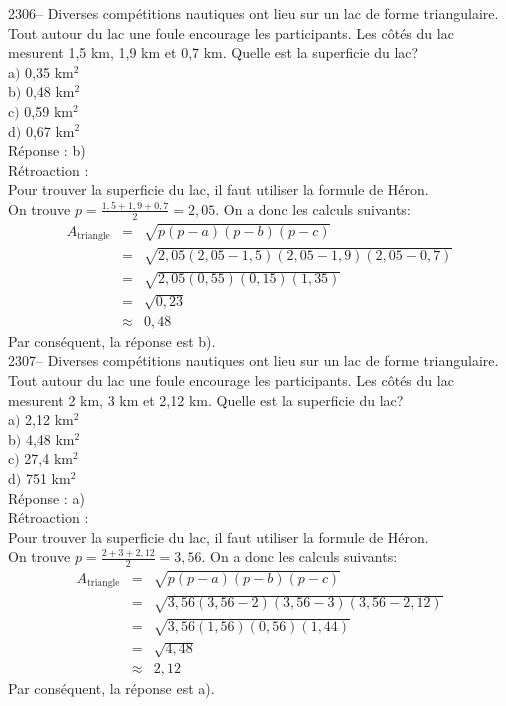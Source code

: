 \documentclass[letterpaper, 12pt]{article}
\begin{document}
2306-- Diverses comp\'etitions nautiques ont lieu sur un lac de forme triangulaire. Tout autour du lac une foule encourage les participants. Les c\^ot\'es du lac mesurent 1,5 km, 1,9 km et 0,7 km.  Quelle est la superficie du lac? \\

a$)$ 0,35 km$^{2}$\\
b$)$ 0,48 km$^{2}$\\
c$)$ 0,59 km$^{2}$\\
d$)$ 0,67 km$^{2}$\\

R\'eponse : b)\\

R\'etroaction :\\
Pour trouver la superficie du lac, il faut utiliser la formule de H\'eron.\\
On trouve \mbox{$p=\frac{1,5+1,9+0,7}{2}=2,05$}. On a donc les calculs suivants:
 \begin{eqnarray*}
A_{\textrm{triangle}}&=&\sqrt{p(p-a)(p-b)(p-c)}\\
&=&\sqrt{2,05(2,05-1,5)(2,05-1,9)(2,05-0,7)}\\
&=&\sqrt{2,05(0,55)(0,15)(1,35)}\\
&=&\sqrt{0,23}\\
&\approx&0,48
\end{eqnarray*}
Par cons\'equent, la r\'eponse est b).\\

2307-- Diverses comp\'etitions nautiques ont lieu sur un lac de forme triangulaire. Tout autour du lac une foule encourage les participants. Les c\^ot\'es du lac mesurent 2 km, 3 km et 2,12 km.  Quelle est la superficie du lac? \\

a$)$ 2,12 km$^{2}$\\
b$)$ 4,48 km$^{2}$\\
c$)$ 27,4 km$^{2}$\\
d$)$ 751 km$^{2}$\\

R\'eponse : a)\\

R\'etroaction :\\
Pour trouver la superficie du lac, il faut utiliser la formule de H\'eron.\\
On trouve $p=\frac{2+3+2,12}{2}=3,56$. On a donc les calculs suivants:
 \begin{eqnarray*}
A_{\textrm{triangle}}&=&\sqrt{p(p-a)(p-b)(p-c)}\\
&=&\sqrt{3,56(3,56-2)(3,56-3)(3,56-2,12)}\\
&=&\sqrt{3,56(1,56)(0,56)(1,44)}\\
&=&\sqrt{4,48}\\
&\approx&2,12
\end{eqnarray*}
Par cons\'equent, la r\'eponse est a).\\
\end{document}
